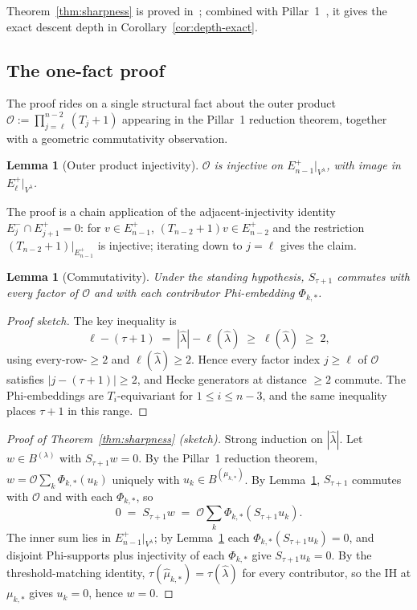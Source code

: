 \documentclass[11pt]{article}
\newtheorem{lemma}[theorem]{Lemma}
\theoremstyle{definition}
\newcommand{\Vlam}{V^{\lambda}}
\newcommand{\bla}{\widehat\lambda}
\newcommand{\elh}{\ell(\bla)}
\newcommand{\Eplus}{E^{+}}
\newcommand{\Eminus}{E^{-}}
\begin{document}
Theorem~\ref{thm:sharpness} is proved in~\cite{sharpnessTauPlus1}; combined
with Pillar~1~\cite{multirowMay15}, it gives the exact descent depth in
Corollary~\ref{cor:depth-exact}.

\subsection{The one-fact proof}\label{sec:sharp-proof}

The proof rides on a single structural fact about the outer product
$\mathcal{O} := \prod_{j=\ell}^{n-2}(T_j + 1)$ appearing in the Pillar~1
reduction theorem, together with a geometric commutativity observation.

\begin{lemma}[Outer product injectivity]\label{lem:outer-injective}
$\mathcal{O}$ is injective on $\Eplus_{n-1}|_{\Vlam}$, with image in
$\Eplus_\ell|_{\Vlam}$.
\end{lemma}

The proof is a chain application of the adjacent-injectivity
identity $\Eminus_j \cap \Eplus_{j+1} = 0$: for $v \in \Eplus_{n-1}$,
$(T_{n-2}+1)v \in \Eplus_{n-2}$ and the restriction $(T_{n-2}+1)|_{\Eplus_{n-1}}$
is injective; iterating down to $j = \ell$ gives the claim.

\begin{lemma}[Commutativity]\label{lem:commutativity}
Under the standing hypothesis, $S_{\tau+1}$ commutes with every factor of
$\mathcal{O}$ and with each contributor Phi-embedding $\Phi_{k,*}$.
\end{lemma}

\begin{proof}[Proof sketch]
The key inequality is
\[
   \ell - (\tau + 1) \;=\; |\bla| - \elh \;\ge\; \elh \;\ge\; 2,
\]
using every-row-$\ge\!2$ and $\elh \ge 2$.  Hence every factor index
$j \ge \ell$ of $\mathcal{O}$ satisfies $|j - (\tau+1)| \ge 2$, and Hecke
generators at distance $\ge 2$ commute.  The Phi-embeddings are
$T_i$-equivariant for $1 \le i \le n-3$, and the same inequality places
$\tau+1$ in this range.
\end{proof}

\begin{proof}[Proof of Theorem~\ref{thm:sharpness} (sketch)]
Strong induction on $|\bla|$.  Let $w \in B^{(\lambda)}$ with $S_{\tau+1} w = 0$.
By the Pillar~1 reduction theorem,
$w = \mathcal{O}\sum_k \Phi_{k,*}(u_k)$ uniquely with $u_k \in B^{(\mu_{k,*})}$.
By Lemma~\ref{lem:commutativity}, $S_{\tau+1}$ commutes with $\mathcal{O}$
and with each $\Phi_{k,*}$, so
\[
   0 \;=\; S_{\tau+1} w \;=\; \mathcal{O}\!\sum_k \Phi_{k,*}(S_{\tau+1} u_k).
\]
The inner sum lies in $\Eplus_{n-1}|_{\Vlam}$; by Lemma~\ref{lem:outer-injective}
each $\Phi_{k,*}(S_{\tau+1} u_k) = 0$, and disjoint Phi-supports plus
injectivity of each $\Phi_{k,*}$ give $S_{\tau+1} u_k = 0$.  By the
threshold-matching identity, $\tau(\hat\mu_{k,*}) = \tau(\bla)$ for every
contributor, so the IH at $\mu_{k,*}$ gives $u_k = 0$, hence $w = 0$.
\end{proof}
\end{document}
